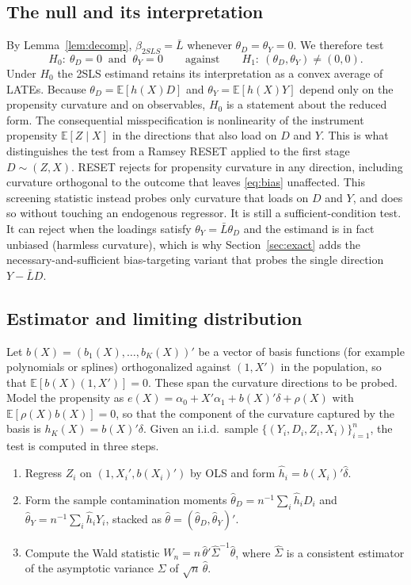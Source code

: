 \documentclass[preprint,11pt,authoryear]{elsarticle}
\theoremstyle{definition}
\newcommand{\E}{\mathbb{E}}
\begin{document}
\subsection{The null and its interpretation}

By Lemma~\ref{lem:decomp}, $\beta_{2SLS}=\bar L$ whenever $\theta_D=\theta_Y=0$.
We therefore test
\begin{equation}\label{eq:null}
H_0:\ \theta_D=0\ \text{ and }\ \theta_Y=0
\qquad\text{against}\qquad
H_1:\ (\theta_D,\theta_Y)\neq(0,0).
\end{equation}
Under $H_0$ the 2SLS estimand retains its interpretation as a convex average of LATEs. Because $\theta_D=\E[h(X)D]$ and $\theta_Y=\E[h(X)Y]$ depend only
on the propensity curvature and on observables, $H_0$ is a statement about the
reduced form. The consequential misspecification is nonlinearity of the
instrument propensity $\E[Z\mid X]$ in the directions that also load on $D$ and
$Y$. This is what distinguishes the test from a Ramsey RESET applied to the first
stage $D\sim(Z,X)$. RESET rejects for propensity curvature in any
direction, including curvature orthogonal to the outcome that leaves
\eqref{eq:bias} unaffected. This screening statistic instead probes only curvature
that loads on $D$ and $Y$, and does so without touching an endogenous regressor. It
is still a sufficient-condition test. It can reject when the loadings satisfy
$\theta_Y=\bar L\theta_D$ and the estimand is in fact unbiased (harmless curvature),
which is why Section~\ref{sec:exact} adds the necessary-and-sufficient
bias-targeting variant that probes the single direction $Y-\bar L D$.

\subsection{Estimator and limiting distribution}

Let $b(X)=(b_1(X),\dots,b_K(X))'$ be a vector of basis functions (for example
polynomials or splines) orthogonalized against $(1,X')$ in the population, so that
$\E[b(X)(1,X')]=0$. These span the curvature directions to be probed. Model the
propensity as $e(X)=\alpha_0+X'\alpha_1+b(X)'\delta+\rho(X)$ with
$\E[\rho(X)b(X)]=0$, so that the component of the curvature captured by the basis
is $h_K(X)=b(X)'\delta$. Given an i.i.d.\ sample $\{(Y_i,D_i,Z_i,X_i)\}_{i=1}^n$,
the test is computed in three steps.

\begin{enumerate}
\item[(i)] Regress $Z_i$ on $(1,X_i',b(X_i)')$ by OLS and form
$\hat h_i=b(X_i)'\hat\delta$.
\item[(ii)] Form the sample contamination moments
$\hat\theta_D=n^{-1}\sum_i \hat h_i D_i$ and
$\hat\theta_Y=n^{-1}\sum_i \hat h_i Y_i$, stacked as
$\hat\theta=(\hat\theta_D,\hat\theta_Y)'$.
\item[(iii)] Compute the Wald statistic
$W_n=n\,\hat\theta'\hat\Sigma^{-1}\hat\theta$, where $\hat\Sigma$ is a consistent
estimator of the asymptotic variance $\Sigma$ of $\sqrt n\,\hat\theta$.
\end{enumerate}
\end{document}
